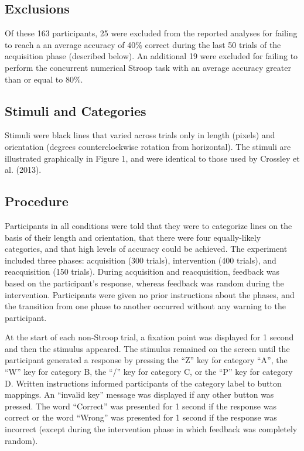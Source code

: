 \documentclass[apacite,draftfirst,man]{apa6}
\begin{document}
\subsection*{Exclusions}
Of these 163 participants, 25 were excluded from the reported analyses for
failing to reach a an average accuracy of 40\% correct during the last 50 trials
of the acquisition phase (described below). An additional 19 were excluded for
failing to perform the concurrent numerical Stroop task with an average accuracy
greater than or equal to 80\%.

\subsection*{Stimuli and Categories} Stimuli were black lines that varied across
trials only in length (pixels) and orientation (degrees counterclockwise
rotation from horizontal). The stimuli are illustrated graphically in Figure 1,
and were identical to those used by Crossley et al. (2013).

\subsection{Procedure} Participants in all conditions were told that they were
to categorize lines on the basis of their length and orientation, that there
were four equally-likely categories, and that high levels of accuracy could be
achieved. The experiment included three phases: acquisition (300 trials),
intervention (400 trials), and reacquisition (150 trials). During acquisition
and reacquisition, feedback was based on the participant's response, whereas
feedback was random during the intervention. Participants were given no prior
instructions about the phases, and the transition from one phase to another
occurred without any warning to the participant.

At the start of each non-Stroop trial, a fixation point was displayed for 1
second and then the stimulus appeared. The stimulus remained on the screen until
the participant generated a response by pressing the ``Z'' key for category
``A'', the ``W'' key for category B, the ``/'' key for category C, or the ``P''
key for category D. Written instructions informed participants of the category
label to button mappings. An ``invalid key'' message was displayed if any other
button was pressed. The word ``Correct'' was presented for 1 second if the
response was correct or the word ``Wrong'' was presented for 1 second if the
response was incorrect (except during the intervention phase in which feedback
was completely random).
\end{document}
